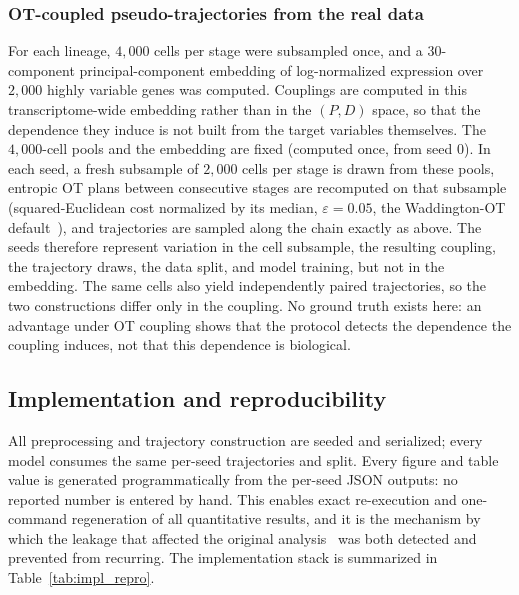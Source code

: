 \documentclass[10pt,letterpaper]{article}
\begin{document}
\subsubsection*{OT-coupled pseudo-trajectories from the real data}
For each lineage, $4{,}000$ cells per stage were subsampled once, and a $30$-component principal-component embedding of log-normalized expression over $2{,}000$ highly variable genes was computed. Couplings are computed in this transcriptome-wide embedding rather than in the $(P,D)$ space, so that the dependence they induce is not built from the target variables themselves. The $4{,}000$-cell pools and the embedding are fixed (computed once, from seed $0$). In each seed, a fresh subsample of $2{,}000$ cells per stage is drawn from these pools, entropic OT plans between consecutive stages are recomputed on that subsample (squared-Euclidean cost normalized by its median, $\varepsilon=0.05$, the Waddington-OT default~\cite{schiebinger2019optimal}), and trajectories are sampled along the chain exactly as above. The seeds therefore represent variation in the cell subsample, the resulting coupling, the trajectory draws, the data split, and model training, but not in the embedding. The same cells also yield independently paired trajectories, so the two constructions differ only in the coupling. No ground truth exists here: an advantage under OT coupling shows that the protocol detects the dependence the coupling induces, not that this dependence is biological.

\subsection*{Implementation and reproducibility}
\label{subsec:impl_repro}

All preprocessing and trajectory construction are seeded and serialized; every model consumes the same per-seed trajectories and split. Every figure and table value is generated programmatically from the per-seed JSON outputs: no reported number is entered by hand. This enables exact re-execution and one-command regeneration of all quantitative results, and it is the mechanism by which the leakage that affected the original analysis~\cite{kanu2026transformer} was both detected and prevented from recurring. The implementation stack is summarized in Table~\ref{tab:impl_repro}.
\end{document}
